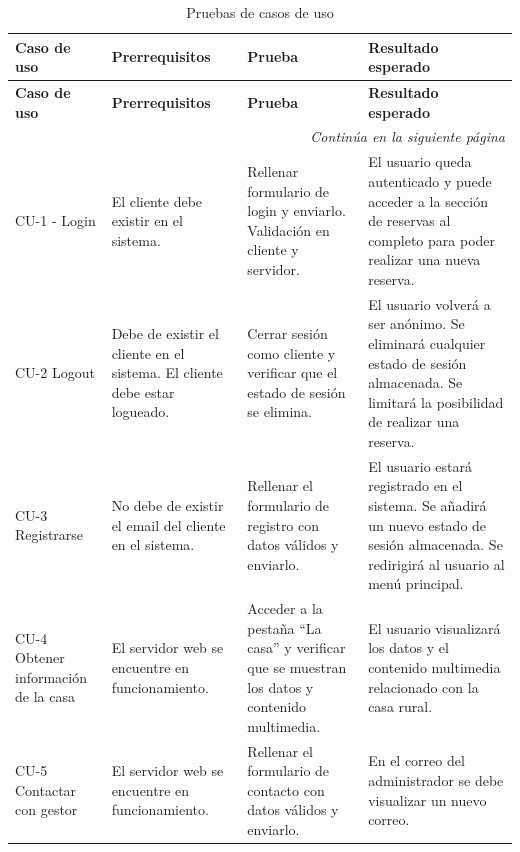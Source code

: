 \begin{longtable}{|p{2.5cm}|p{3.5cm}|p{4.5cm}|p{5cm}|}
\caption{Pruebas de casos de uso}
\label{tbl:pruebasCU} \\
\hline
\textbf{Caso de uso} & \textbf{Prerrequisitos} & \textbf{Prueba} & \textbf{Resultado esperado} \\
\hline
\endfirsthead

\hline
\textbf{Caso de uso} & \textbf{Prerrequisitos} & \textbf{Prueba} & \textbf{Resultado esperado} \\
\hline
\endhead

\hline
\multicolumn{4}{r}{\textit{Continúa en la siguiente página}} \\
\endfoot

\hline
\endlastfoot
		CU-1 - Login & 
		El cliente debe existir en el sistema. &
		Rellenar formulario de login y enviarlo. Validación en cliente y servidor. &
		El usuario queda autenticado y puede acceder a la sección de reservas al completo para poder realizar una nueva reserva. \\ \hline
CU-2 Logout &
Debe de existir el cliente en el sistema. \newline El cliente debe estar logueado. &
Cerrar sesión como cliente y verificar que el estado de sesión se elimina. &
El usuario volverá a ser anónimo. \newline Se eliminará cualquier estado de sesión almacenada. \newline Se limitará la posibilidad de realizar una reserva. \\ \hline

CU-3 Registrarse &
No debe de existir el email del cliente en el sistema. &
Rellenar el formulario de registro con datos válidos y enviarlo. &
El usuario estará registrado en el sistema. \newline Se añadirá un nuevo estado de sesión almacenada. \newline Se redirigirá al usuario al menú principal. \\ \hline

CU-4 Obtener información de la casa &
El servidor web se encuentre en funcionamiento. &
Acceder a la pestaña ``La casa'' y verificar que se muestran los datos y contenido multimedia. &
El usuario visualizará los datos y el contenido multimedia relacionado con la casa rural. \\ \hline

CU-5 Contactar con gestor &
El servidor web se encuentre en funcionamiento. &
Rellenar el formulario de contacto con datos válidos y enviarlo. &
En el correo del administrador se debe visualizar un nuevo correo. \\ \hline


\end{longtable}
